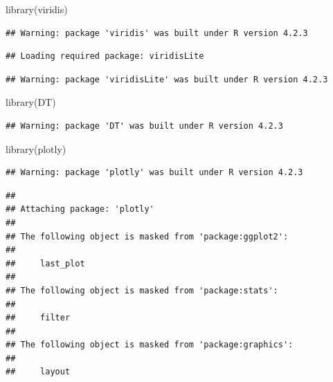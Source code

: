 \documentclass[
]{article}
\newenvironment{Shaded}{\begin{snugshade}}{\end{snugshade}}
\newcommand{\FunctionTok}[1]{\textcolor[rgb]{0.00,0.00,0.00}{#1}}
\newcommand{\NormalTok}[1]{#1}
\begin{document}
\begin{Shaded}
\begin{Highlighting}[]
\FunctionTok{library}\NormalTok{(viridis)}
\end{Highlighting}
\end{Shaded}

\begin{verbatim}
## Warning: package 'viridis' was built under R version 4.2.3
\end{verbatim}

\begin{verbatim}
## Loading required package: viridisLite
\end{verbatim}

\begin{verbatim}
## Warning: package 'viridisLite' was built under R version 4.2.3
\end{verbatim}

\begin{Shaded}
\begin{Highlighting}[]
\FunctionTok{library}\NormalTok{(DT)}
\end{Highlighting}
\end{Shaded}

\begin{verbatim}
## Warning: package 'DT' was built under R version 4.2.3
\end{verbatim}

\begin{Shaded}
\begin{Highlighting}[]
\FunctionTok{library}\NormalTok{(plotly)}
\end{Highlighting}
\end{Shaded}

\begin{verbatim}
## Warning: package 'plotly' was built under R version 4.2.3
\end{verbatim}

\begin{verbatim}
## 
## Attaching package: 'plotly'
## 
## The following object is masked from 'package:ggplot2':
## 
##     last_plot
## 
## The following object is masked from 'package:stats':
## 
##     filter
## 
## The following object is masked from 'package:graphics':
## 
##     layout
\end{verbatim}
\end{document}
